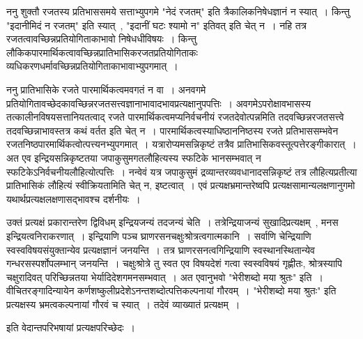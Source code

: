 	ननु शुक्तौ रजतस्य प्रतिभाससमये सत्ताभ्युपगमे "नेदं रजतम्" इति त्रैकालिकनिषेधज्ञानं न स्यात्~। किन्तु "इदानीमिदं न रजतम्" इति स्यात्~, "इदानीं घटः श्यामो न" इतिवत् इति चेत् न~। नहि तत्र रजतत्वावच्छिन्नप्रतियोगिताकाभावो निषेधधीविषयः~। किन्तु लौकिकपारमार्थिकत्वावच्छिन्नप्रातिभासिकरजतप्रतियोगिताकः व्यधिकरणधर्मावच्छिन्नप्रतियोगिताकाभावाभ्युपगमात्~। \par
	ननु प्रातिभासिके रजते पारमार्थिकत्वमवगतं न वा~। अनवगमे प्रतियोगितावच्छेदकावच्छिन्नरजतसत्त्वज्ञानाभावादभावप्रत्यक्षानुपपत्तिः~। अवगमेऽपरोक्षावभासस्य तत्कालीनविषयसत्तानियतत्वाद् रजते पारमार्थिकत्वमप्यनिर्वचनीयं रजतदेवोत्पन्नमिति तदवच्छिन्नरजतसत्त्वे तदवच्छिन्नाभावस्तत्र कथं वर्तत इति चेत् न~। पारमार्थिकत्वस्याधिष्ठाननिष्ठस्य रजते प्रतिभाससम्भवेन रजतनिष्ठपारमार्थिकत्वोत्पत्त्यनभ्युपगमात्~। यत्रारोप्यमसन्निकृष्टं तत्रैव प्रातिभासिकवस्तूत्पत्तेरङ्गीकारात्~। अत एव इन्द्रियसन्निकृष्टतया जपाकुसुमगतलौहित्यस्य स्फटिके भानसम्भवात् न स्फटिकेऽनिर्वचनीयलौहित्योत्पत्तिः~। नन्वेवं यत्र जपाकुसुमं द्रव्यान्तरव्यवधानादसन्निकृष्टं तत्र लौहित्यप्रतीत्या प्रातिभासिकं लौहित्यं स्वीक्रियतामिति चेत् न, इष्टत्वात्~। एवं प्रत्यक्षभ्रमान्तरेष्वपि प्रत्यक्षसामान्यलक्षणानुगमो यथार्थप्रत्यक्षलक्षणासद्भावश्च दर्शनीयः~।\par
	उक्तं प्रत्यक्षं प्रकारान्तरेण द्विविधम् इन्द्रियजन्यं तदजन्यं चेति~। तत्रेन्द्रियाजन्यं सुखादिप्रत्यक्षम्~, मनस इन्द्रियत्वनिराकरणात्~। इन्द्रियाणि पञ्च घ्राणरसनचक्षुःश्रोत्रत्वगात्मकानि~। सर्वाणि चेन्द्रियाणि स्वस्वविषयसंयुक्तान्येव प्रत्यक्षज्ञानं जनयन्ति~। तत्र घ्राणरसनत्वगिन्द्रियाणि स्वस्थानस्थितान्येव गन्धरसस्पर्शोपलम्भान् जनयन्ति~। चक्षुःश्रोत्रे तु स्वत एव विषयदेशं गत्वा स्वस्वविषयं गृह्णीतः, श्रोत्रस्यापि चक्षुरादिवत् परिच्छिन्नतया भेर्यादिदेशगमनसम्भवात्~। अत एवानुभवो "भेरीशब्दो मया श्रुतः" इति~। वीचितरङ्गादिन्यायेन कर्णशष्कुलीप्रदेशेऽनन्तशब्दोत्पत्तिकल्पनायां गौरवम्~। "भेरीशब्दो मया श्रुतः" इति प्रत्यक्षस्य भ्रमत्वकल्पनायां गौरवं च स्यात्~। तदेवं व्याख्यातं प्रत्यक्षम्~।\\
	\begin{center} इति वेदान्तपरिभषायां प्रत्यक्षपरिच्छेदः~।\end{center} 
